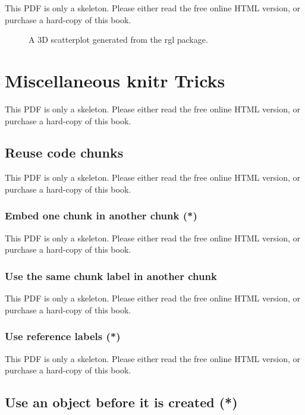 \documentclass[
  11pt,
]{krantz}
\begin{document}
This PDF is only a skeleton. Please either read the free online HTML version, or purchase a hard-copy of this book.

\begin{figure}\caption{A 3D scatterplot generated from the rgl package.}\end{figure}

\chapter{Miscellaneous knitr Tricks}\label{knitr-misc}

This PDF is only a skeleton. Please either read the free online HTML version, or purchase a hard-copy of this book.

\section{Reuse code chunks}\label{reuse-chunks}

This PDF is only a skeleton. Please either read the free online HTML version, or purchase a hard-copy of this book.

\subsection{Embed one chunk in another chunk (*)}\label{embed-chunk}

This PDF is only a skeleton. Please either read the free online HTML version, or purchase a hard-copy of this book.

\subsection{Use the same chunk label in another chunk}\label{same-label}

This PDF is only a skeleton. Please either read the free online HTML version, or purchase a hard-copy of this book.

\subsection{Use reference labels (*)}\label{ref-label}

This PDF is only a skeleton. Please either read the free online HTML version, or purchase a hard-copy of this book.

\section{Use an object before it is created (*)}\label{load-cache}
\end{document}
